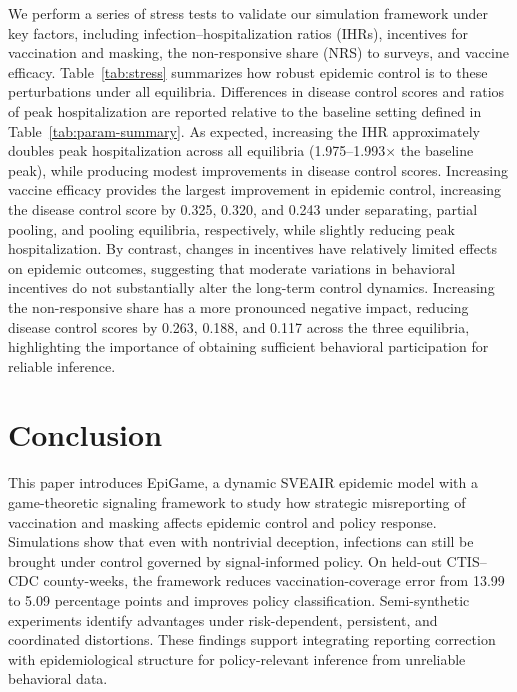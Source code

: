 \documentclass[sigconf,review]{acmart}
\newcommand{\model}{EpiGame}
\begin{document}
We perform a series of stress tests to validate our simulation framework under key factors, including infection--hospitalization ratios (IHRs), incentives for vaccination and masking, the non-responsive share (NRS) to surveys, and vaccine efficacy. Table~\ref{tab:stress} summarizes how robust epidemic control is to these perturbations under all equilibria. Differences in disease control scores and ratios of peak hospitalization are reported relative to the baseline setting defined in Table~\ref{tab:param-summary}. As expected, increasing the IHR approximately doubles peak hospitalization across all equilibria (1.975--1.993$\times$ the baseline peak), while producing modest improvements in disease control scores. Increasing vaccine efficacy provides the largest improvement in epidemic control, increasing the disease control score by 0.325, 0.320, and 0.243 under separating, partial pooling, and pooling equilibria, respectively, while slightly reducing peak hospitalization. By contrast, changes in incentives have relatively limited effects on epidemic outcomes, suggesting that moderate variations in behavioral incentives do not substantially alter the long-term control dynamics. Increasing the non-responsive share has a more pronounced negative impact, reducing disease control scores by 0.263, 0.188, and 0.117 across the three equilibria, highlighting the importance of obtaining sufficient behavioral participation for reliable inference. %


\section{Conclusion}
This paper introduces \model{}, a dynamic SVEAIR epidemic model with a game-theoretic signaling framework to study how strategic misreporting of vaccination and masking affects epidemic control and policy response. 
Simulations show that even with nontrivial deception, infections can still be brought under control governed by signal-informed policy. 
On held-out CTIS--CDC county-weeks, the framework reduces vaccination-coverage error from 13.99 to 5.09 percentage points and improves policy classification. 
Semi-synthetic experiments identify advantages under risk-dependent, persistent, and coordinated distortions. 
These findings support integrating reporting correction with epidemiological structure for policy-relevant inference from unreliable behavioral data.
\end{document}

